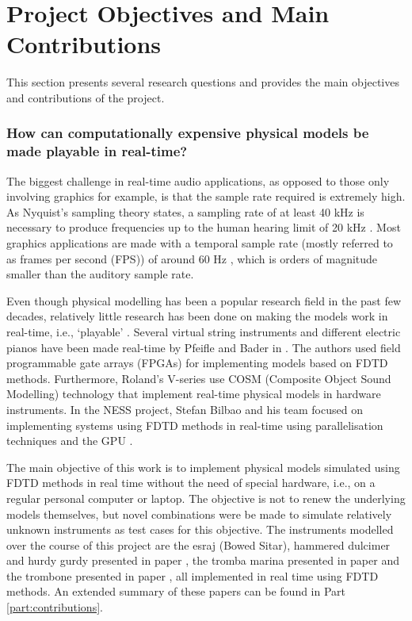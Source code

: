 \section{Project Objectives and Main Contributions}
This section presents several research questions and provides the main objectives and contributions of the project. 

\subsubsection{How can computationally expensive physical models be made playable in real-time?}

The biggest challenge in real-time audio applications, as opposed to those only involving graphics for example, is that the sample rate required is extremely high. As Nyquist's sampling theory states, a sampling rate of at least 40 kHz is necessary to produce frequencies up to the human hearing limit of 20 kHz \cite{Nyquist}. Most graphics applications are made with a temporal sample rate (mostly referred to as frames per second (FPS)) of around 60 Hz \cite{Yantis2016}, which is orders of magnitude smaller than the auditory sample rate.

Even though physical modelling has been a popular research field in the past few decades, relatively little research has been done on making the models work in real-time, i.e., `playable’ \cite{Mehes2016}. Several virtual string instruments and different electric pianos have been made real-time by Pfeifle and Bader in \cite{Pfeifle2012, Pfeifle2015, Pfeifle2017}. The authors used field programmable gate arrays (FPGAs) for implementing models based on FDTD methods. Furthermore, Roland’s V-series use COSM (Composite Object Sound Modelling) technology \cite{Bybee2019} that implement real-time physical models in hardware instruments. In the NESS project, Stefan Bilbao and his team focused on implementing systems using FDTD methods in real-time using parallelisation techniques and the GPU \cite{Bilbao2019CMJa,Bilbao2019CMJb}. 

The main objective of this work is to implement physical models simulated using FDTD methods in real time without the need of special hardware, i.e., on a regular personal computer or laptop. The objective is not to renew the underlying models themselves, but novel combinations were be made to simulate relatively unknown instruments as test cases for this objective. The instruments modelled over the course of this project are the esraj (Bowed Sitar), hammered dulcimer and hurdy gurdy presented in paper \citeP[A], the tromba marina presented in paper \citeP[D] and the trombone presented in paper \citeP[H], all implemented in real time using FDTD methods. An extended summary of these papers can be found in Part \ref{part:contributions}.

